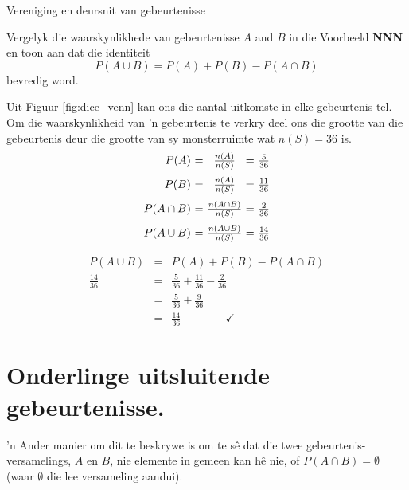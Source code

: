 \begin{wex}{Vereniging en deursnit van gebeurtenisse}{
  Vergelyk die waarskynlikhede van gebeurtenisse $A$ and $B$ in die Voorbeeld \textbf{NNN} en toon aan dat die identiteit 
\[P(A \cup B) = P(A) + P(B) - P(A \cap B)\]
bevredig word.

}{
  
Uit Figuur \ref{fig:dice_venn} kan ons die aantal uitkomste in elke gebeurtenis tel. Om die waarskynlikheid van 'n gebeurtenis te verkry deel ons die grootte van die gebeurtenis deur die grootte van sy monsterruimte wat $n(S)=36$ is.
  \[\begin{array}{r@{$\ =\ $}c@{$\ =\ $}l}
    P(A)        & \frac{n(A)}{n(S)}        & \frac{5}{36}  \\[8pt]
    P(B)        & \frac{n(A)}{n(S)}        & \frac{11}{36} \\[8pt]
    P(A \cap B) & \frac{n(A \cap B)}{n(S)} & \frac{2}{36}  \\[8pt]
    P(A \cup B) & \frac{n(A \cup B)}{n(S)} & \frac{14}{36}
  \end{array}\]


  \begin{eqnarray*}
    P(A \cup B) &=& P(A) + P(B) - P(A \cap B) \\
    \frac{14}{36} &=& \frac{5}{36} + \frac{11}{36} - \frac{2}{36} \\
    &=& \frac{5}{36} + \frac{9}{36} \\
    &=& \frac{14}{36} \qquad\qquad\checkmark
  \end{eqnarray*}
}
\end{wex}

\section{Onderlinge uitsluitende gebeurtenisse.}

'n Ander manier om dit te beskrywe is om te s\^e dat die twee gebeurtenis-versamelings, $A$ en $B$, nie elemente in gemeen kan h\^e nie, of $P(A \cap B) = \emptyset$
(waar $\emptyset$ die lee versameling aandui).

